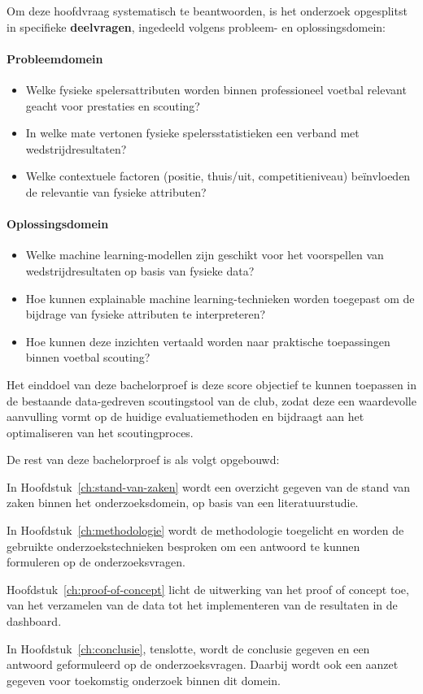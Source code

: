 Om deze hoofdvraag systematisch te beantwoorden, is het onderzoek opgesplitst in specifieke \textbf{deelvragen}, ingedeeld volgens probleem- en oplossingsdomein:

\paragraph{Probleemdomein}
\begin{itemize}
    \item Welke fysieke spelersattributen worden binnen professioneel voetbal relevant geacht voor prestaties en scouting?
    \item In welke mate vertonen fysieke spelersstatistieken een verband met wedstrijdresultaten?
    \item Welke contextuele factoren (positie, thuis/uit, competitieniveau) beïnvloeden de relevantie van fysieke attributen?
\end{itemize}

\paragraph{Oplossingsdomein}
\begin{itemize}
    \item  Welke machine learning-modellen zijn geschikt voor het voorspellen van wedstrijdresultaten op basis van fysieke data? 
    \item Hoe kunnen explainable machine learning-technieken worden toegepast om de bijdrage van fysieke attributen te interpreteren?
    \item Hoe kunnen deze inzichten vertaald worden naar praktische toepassingen binnen voetbal scouting?
\end{itemize}

Het einddoel van deze bachelorproef is deze score objectief te kunnen toepassen in de bestaande data-gedreven scoutingstool van de club, zodat deze een waardevolle aanvulling vormt op de huidige evaluatiemethoden en bijdraagt aan het optimaliseren van het scoutingproces.


De rest van deze bachelorproef is als volgt opgebouwd:

In Hoofdstuk~\ref{ch:stand-van-zaken} wordt een overzicht gegeven van de stand van zaken binnen het onderzoeksdomein, op basis van een literatuurstudie.

In Hoofdstuk~\ref{ch:methodologie} wordt de methodologie toegelicht en worden de gebruikte onderzoekstechnieken besproken om een antwoord te kunnen formuleren op de onderzoeksvragen.

Hoofdstuk~\ref{ch:proof-of-concept} licht de uitwerking van het proof of concept toe, van het verzamelen van de data tot het implementeren van de resultaten in de dashboard.

In Hoofdstuk~\ref{ch:conclusie}, tenslotte, wordt de conclusie gegeven en een antwoord geformuleerd op de onderzoeksvragen. Daarbij wordt ook een aanzet gegeven voor toekomstig onderzoek binnen dit domein.